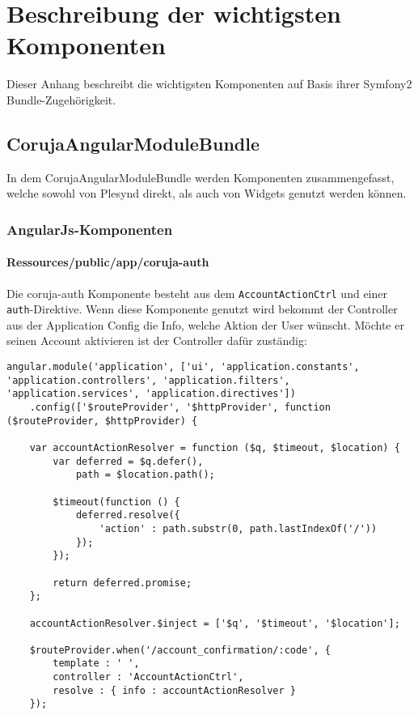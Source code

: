 
\chapter{Beschreibung der wichtigsten Komponenten}
\label{AppendixB}

Dieser Anhang beschreibt die wichtigsten Komponenten auf Basis ihrer Symfony2 Bundle-Zugehörigkeit.


\section{CorujaAngularModuleBundle}
In dem CorujaAngularModuleBundle werden Komponenten zusammengefasst, welche sowohl von Plesynd direkt, als auch von Widgets genutzt werden können. 

\subsection{AngularJs-Komponenten}

\subsubsection{Ressources/public/app/coruja-auth}\label{section:coruja_auth}
Die coruja-auth Komponente besteht aus dem \texttt{AccountActionCtrl} und einer \texttt{auth}-Direktive. Wenn diese Komponente genutzt wird bekommt der Controller aus der Application Config die Info, welche Aktion der User wünscht. Möchte er seinen Account aktivieren ist der Controller dafür zuständig:
\begin{lstlisting}[caption=Hauptapplikation reagiert auf Account Confirmation Route]
 angular.module('application', ['ui', 'application.constants', 'application.controllers', 'application.filters', 'application.services', 'application.directives'])
    .config(['$routeProvider', '$httpProvider', function ($routeProvider, $httpProvider) {

    var accountActionResolver = function ($q, $timeout, $location) {
        var deferred = $q.defer(),
            path = $location.path();

        $timeout(function () {
            deferred.resolve({
                'action' : path.substr(0, path.lastIndexOf('/'))
            });
        });

        return deferred.promise;
    };

    accountActionResolver.$inject = ['$q', '$timeout', '$location'];

    $routeProvider.when('/account_confirmation/:code', {
        template : ' ',
        controller : 'AccountActionCtrl',
        resolve : { info : accountActionResolver }
    });

\end{lstlisting}

